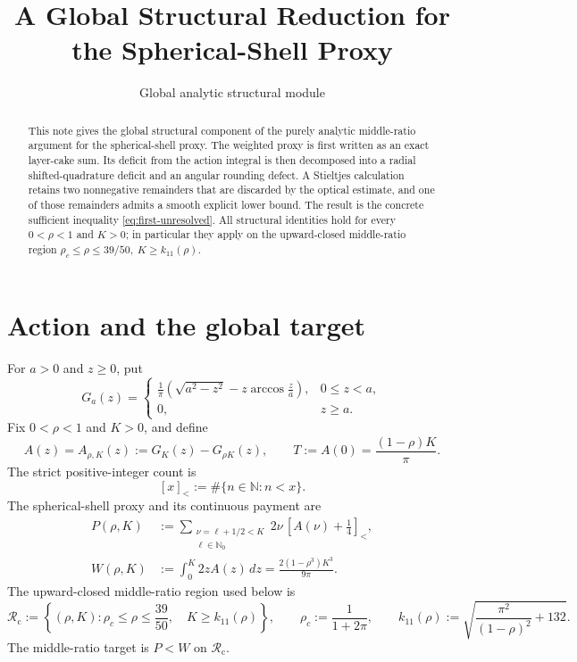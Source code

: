 \documentclass[11pt]{article}
\title{A Global Structural Reduction for the Spherical-Shell Proxy}
\author{}
\date{Global analytic structural module}
\theoremstyle{remark}
\newcommand{\N}{\mathbb N}
\newcommand{\strict}[1]{\left[#1\right]_{<}}
\begin{document}
\maketitle

\begin{abstract}
This note gives the global structural component of the purely analytic
middle-ratio argument for the spherical-shell proxy.  The weighted proxy is
first written as an exact layer-cake sum.  Its deficit from the action
integral is then decomposed into a radial shifted-quadrature deficit and an
angular rounding defect.  A Stieltjes calculation retains two nonnegative
remainders that are discarded by the optical estimate, and one of those
remainders admits a smooth explicit lower bound.  The result is the concrete
sufficient inequality \eqref{eq:first-unresolved}.  All structural identities
hold for every $0<\rho<1$ and $K>0$; in particular they apply on the
upward-closed
middle-ratio region
\(
 \rho_c\leq\rho\leq39/50,
 \ K\geq k_{11}(\rho)
\).
\end{abstract}

\section{Action and the global target}

For $a>0$ and $z\geq0$, put
\begin{equation}
 G_a(z)=
 \begin{cases}
 \displaystyle \frac1\pi\left(\sqrt{a^2-z^2}
       -z\arccos\frac za\right),&0\leq z<a,\\[4pt]
 0,&z\geq a.
 \end{cases}
 \label{eq:G-def}
\end{equation}
Fix $0<\rho<1$ and $K>0$, and define
\begin{equation}
 A(z)=A_{\rho,K}(z):=G_K(z)-G_{\rho K}(z),
 \qquad
 T:=A(0)=\frac{(1-\rho)K}{\pi}.
 \label{eq:A-def}
\end{equation}
The strict positive-integer count is
\[
 \strict{x}:=\#\{n\in\N:n<x\}.
\]
The spherical-shell proxy and its continuous payment are
\begin{align}
 P(\rho,K)
 &:=\sum_{\substack{\nu=\ell+1/2<K\\ \ell\in\mathbb N_0}}
       2\nu\,\strict{A(\nu)+\tfrac14},
 \label{eq:proxy-def}\\
 W(\rho,K)
 &:=\int_0^K2zA(z)\,dz
   =\frac{2(1-\rho^3)K^3}{9\pi}.
 \label{eq:W-def}
\end{align}
The upward-closed middle-ratio region used below is
\begin{equation}
 \mathcal R_{\mathrm c}:=
 \left\{(\rho,K):
 \rho_c\leq\rho\leq\frac{39}{50},\quad
 K\geq k_{11}(\rho)\right\},
 \qquad
 \rho_c:=\frac1{1+2\pi},
 \qquad
 k_{11}(\rho):=
 \sqrt{\frac{\pi^2}{(1-\rho)^2}+132}.
 \label{eq:compact-residual}
\end{equation}
The middle-ratio target is $P<W$ on $\mathcal R_{\mathrm c}$.
\end{document}
